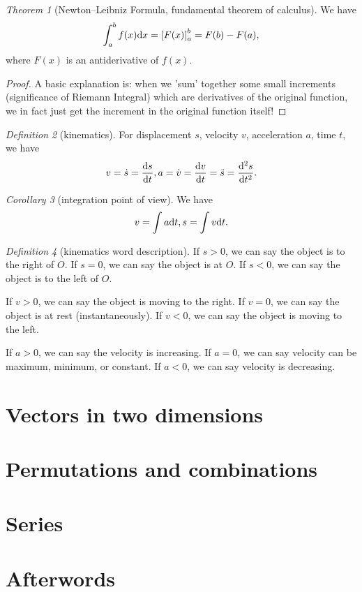 \documentclass[8pt]{article}
\theoremstyle{remark}
\newtheorem{theorem}{Theorem}[section]
\newtheorem{corollary}[theorem]{Corollary}
\newtheorem{definition}[theorem]{Definition}
\begin{document}
            \begin{theorem}[Newton--Leibniz Formula, fundamental theorem of calculus]
                We have
                $$
                    \int_a^b f(x) \mathrm{d} x = \left[F(x)\right]_a^b = F(b) - F(a),
                $$
                where $F(x)$ is an antiderivative of $f(x)$.
                \begin{proof}
                    A basic explanation is: when we 'sum' together some small increments (significance of Riemann Integral) which are derivatives of the original function, we in fact just get the increment in the original function itself!
                \end{proof}
            \end{theorem}

            \begin{definition}[kinematics]
                For displacement $s$, velocity $v$, acceleration $a$, time $t$, we have
                $$
                    v = \dot{s} = \frac{\mathrm{d} s}{\mathrm{d} t}, a = \dot{v} = \frac{\mathrm{d} v}{\mathrm{d} t} = \ddot{s} = \frac{\mathrm{d}^2 s}{\mathrm{d} t^2}.
                $$
            \end{definition}

            \begin{corollary}[integration point of view]
                We have
                $$
                    v = \int a \mathrm{d} t, s = \int v \mathrm{d} t.
                $$
            \end{corollary}

            \begin{definition}[kinematics word description]
                If $s > 0$, we can say the object is to the right of $O$. If $s = 0$, we can say the object is at $O$. If $s < 0$, we can say the object is to the left of $O$.

                If $v > 0$, we can say the object is moving to the right. If $v = 0$, we can say the object is at rest (instantaneously). If $v < 0$, we can say the object is moving to the left.

                If $a > 0$, we can say the velocity is increasing. If $a = 0$, we can say velocity can be maximum, minimum, or constant. If $a < 0$, we can say velocity is decreasing.
            \end{definition}

    \section{Vectors in two dimensions}

        

    \section{Permutations and combinations}

        

    \section{Series}

        

    \section*{Afterwords}

        
\end{document}
